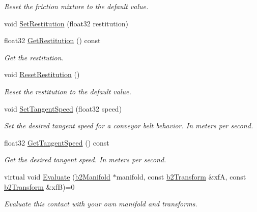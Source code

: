 \begin{DoxyCompactItemize}
\begin{DoxyCompactList}\small\item\em Reset the friction mixture to the default value. \end{DoxyCompactList}\item 
void \hyperlink{classb2Contact_a24ca342c2bb766c53ef5ad04f5268fc1}{Set\+Restitution} (float32 restitution)
\item 
\mbox{\label{classb2Contact_a9fb6e637026914c8752f89f91122b561}} 
float32 \hyperlink{classb2Contact_a9fb6e637026914c8752f89f91122b561}{Get\+Restitution} () const
\begin{DoxyCompactList}\small\item\em Get the restitution. \end{DoxyCompactList}\item 
\mbox{\label{classb2Contact_a243501bc5c146e9eb1296162d328aef1}} 
void \hyperlink{classb2Contact_a243501bc5c146e9eb1296162d328aef1}{Reset\+Restitution} ()
\begin{DoxyCompactList}\small\item\em Reset the restitution to the default value. \end{DoxyCompactList}\item 
\mbox{\label{classb2Contact_a32033914a6c7f35b469e8fddbc17c566}} 
void \hyperlink{classb2Contact_a32033914a6c7f35b469e8fddbc17c566}{Set\+Tangent\+Speed} (float32 speed)
\begin{DoxyCompactList}\small\item\em Set the desired tangent speed for a conveyor belt behavior. In meters per second. \end{DoxyCompactList}\item 
\mbox{\label{classb2Contact_a927125db0b36947a3bb53c4e3eded1cd}} 
float32 \hyperlink{classb2Contact_a927125db0b36947a3bb53c4e3eded1cd}{Get\+Tangent\+Speed} () const
\begin{DoxyCompactList}\small\item\em Get the desired tangent speed. In meters per second. \end{DoxyCompactList}\item 
\mbox{\label{classb2Contact_ae3c2842e5325b2d4500f8ed1d4de2f72}} 
virtual void \hyperlink{classb2Contact_ae3c2842e5325b2d4500f8ed1d4de2f72}{Evaluate} (\hyperlink{structb2Manifold}{b2\+Manifold} $\ast$manifold, const \hyperlink{structb2Transform}{b2\+Transform} \&xfA, const \hyperlink{structb2Transform}{b2\+Transform} \&xfB)=0
\begin{DoxyCompactList}\small\item\em Evaluate this contact with your own manifold and transforms. \end{DoxyCompactList}\end{DoxyCompactItemize}
